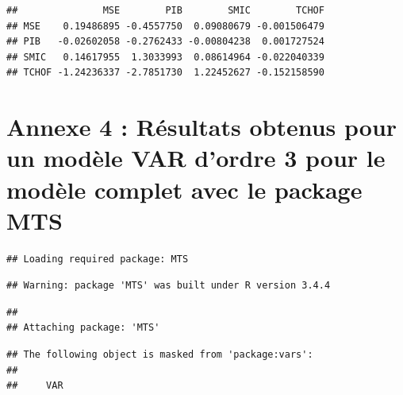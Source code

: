 \documentclass[11pt,]{article}
\begin{document}
\begin{verbatim}
##               MSE        PIB        SMIC        TCHOF
## MSE    0.19486895 -0.4557750  0.09080679 -0.001506479
## PIB   -0.02602058 -0.2762433 -0.00804238  0.001727524
## SMIC   0.14617955  1.3033993  0.08614964 -0.022040339
## TCHOF -1.24236337 -2.7851730  1.22452627 -0.152158590
\end{verbatim}

\section{\texorpdfstring{Annexe 4 : Résultats obtenus pour un modèle VAR
d'ordre 3 pour le modèle complet avec le package MTS
\label{Annexe4}}{Annexe 4 : Résultats obtenus pour un modèle VAR d'ordre 3 pour le modèle complet avec le package MTS }}\label{annexe-4-resultats-obtenus-pour-un-modele-var-dordre-3-pour-le-modele-complet-avec-le-package-mts}

\begin{verbatim}
## Loading required package: MTS
\end{verbatim}

\begin{verbatim}
## Warning: package 'MTS' was built under R version 3.4.4
\end{verbatim}

\begin{verbatim}
## 
## Attaching package: 'MTS'
\end{verbatim}

\begin{verbatim}
## The following object is masked from 'package:vars':
## 
##     VAR
\end{verbatim}
\end{document}
